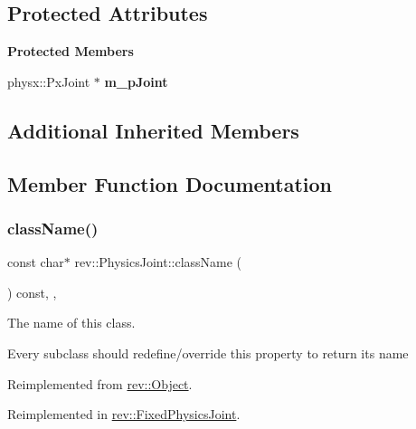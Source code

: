 \subsection*{Protected Attributes}
\begin{Indent}\textbf{ Protected Members}\par
\begin{DoxyCompactItemize}
\item 
\mbox{\label{classrev_1_1_physics_joint_a552986786cea5ed58b40d411110deef4}} 
physx\+::\+Px\+Joint $\ast$ {\bfseries m\+\_\+p\+Joint}
\end{DoxyCompactItemize}
\end{Indent}
\subsection*{Additional Inherited Members}


\subsection{Member Function Documentation}
\mbox{\label{classrev_1_1_physics_joint_aef7f21c8a657ce02326b965af8835517}} 
\subsubsection{\texorpdfstring{className()}{className()}}
{\footnotesize\ttfamily const char$\ast$ rev\+::\+Physics\+Joint\+::class\+Name (\begin{DoxyParamCaption}{ }\end{DoxyParamCaption}) const\hspace{0.3cm}{\ttfamily [inline]}, {\ttfamily [override]}, {\ttfamily [virtual]}}



The name of this class. 

Every subclass should redefine/override this property to return its name 

Reimplemented from \mbox{\hyperlink{classrev_1_1_object_a7a2013f91169479b65cf93afdc5d9a68}{rev\+::\+Object}}.



Reimplemented in \mbox{\hyperlink{classrev_1_1_fixed_physics_joint_a50a695b0b2cb3cb212ee03d38db3d981}{rev\+::\+Fixed\+Physics\+Joint}}.

